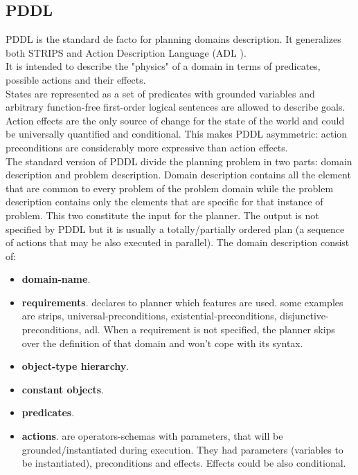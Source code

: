 \documentclass[pdftex,12pt,a4paper]{report}
\begin{document}
\subsection{PDDL}\label{pddl}
\noindent PDDL \cite{mcdermott1998pddl} %
is the standard de facto for planning domains description. It generalizes both STRIPS\cite{fikes1971strips} %
and Action Description Language (ADL \cite{pednault1987formulating}).%
\\\noindent It is intended to describe the "physics" of a domain in terms of predicates, possible actions and their effects.
\\\noindent States are represented as a set of predicates with grounded variables and arbitrary function-free first-order logical sentences are allowed to describe goals. 
Action effects are the only source of change for the state of the world and could be universally quantified and conditional. This makes PDDL asymmetric: action preconditions are considerably more expressive than action effects.
\\\noindent The standard version of PDDL divide the planning problem in two parts: domain description and problem description. Domain description contains all the element that are common to every problem of the problem domain while the problem description contains only the elements that are specific for that instance of problem. This two constitute the input for the planner. The output is not specified by PDDL but it is usually a totally/partially ordered plan (a sequence of actions that may be also executed in parallel).
The domain description consist of:
\begin{itemize}
\item \textbf{domain-name}. 
\item \textbf{requirements}. declares to planner which features are used. some examples are strips, universal-preconditions, existential-preconditions, disjunctive-preconditions, adl. When a requirement is not specified, the planner skips over the definition of that domain and won't cope with its syntax.
\item \textbf{object-type hierarchy}.
\item \textbf{constant objects}.
\item \textbf{predicates}.
\item \textbf{actions}. are operators-schemas with parameters, that will be grounded/instantiated during execution. They had parameters (variables to be instantiated), preconditions and effects. Effects could be also conditional. 
\end{itemize}
\end{document}
